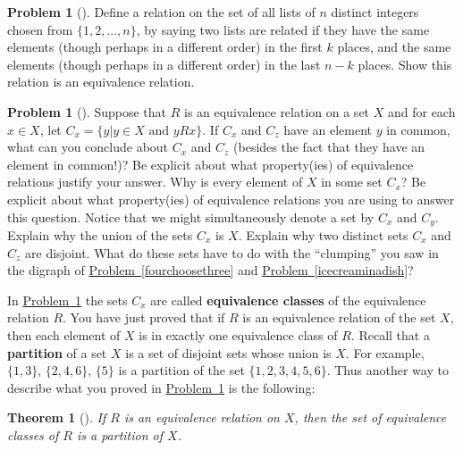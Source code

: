 \documentclass[10pt,]{book}
\newcommand{\terminology}[1]{\textbf{#1}}
\theoremstyle{plain}
\newtheorem{theorem}{Theorem}[section]
\theoremstyle{definition}
\newtheorem{activity}[project]{Problem}
\theoremstyle{definition}
\numberwithin{equation}{chapter}
\begin{document}
\begin{activity}[]\marginsymbol[-1em]{} \label{activity-351}
\hypertarget{p-1947}{}%
Define a relation on the set of all lists of \(n\) distinct integers chosen from \(\{1,2,\ldots, n\}\), by saying two lists are related if they have the same elements (though perhaps in a different order) in the first \(k\) places, and the same elements (though perhaps in a different order) in the last \(n-k\) places. Show this relation is an equivalence relation.%
\end{activity}
\begin{activity}[]\marginsymbol[-1em]{} \label{equivalenceclasses}
\hypertarget{p-1949}{}%
Suppose that \(R\) is an equivalence relation on a set \(X\) and for each \(x\in X\), let \(C_x = \{y| y\in X \text{ and }
yRx\}\). If \(C_x\) and \(C_z\) have an element \(y\) in common, what can you conclude about \(C_x\) and \(C_z\) (besides the fact that they have an element in common!)? Be explicit about what property(ies) of equivalence relations justify your answer. Why is every element of \(X\) in some set \(C_x\)? Be explicit about what property(ies) of equivalence relations you are using to answer this question. Notice that we might simultaneously denote a set by \(C_x\) and \(C_y\). Explain why the union of the sets \(C_x\) is \(X\). Explain why two distinct sets \(C_x\) and \(C_z\) are disjoint. What do these sets have to do with the ``clumping'' you saw in the digraph of \hyperref[fourchoosethree]{Problem~\ref{fourchoosethree}} and \hyperref[icecreaminadish]{Problem~\ref{icecreaminadish}}?%
\end{activity}
\hypertarget{p-1951}{}%
In \hyperref[equivalenceclasses]{Problem~\ref{equivalenceclasses}} the sets \(C_x\) are called \terminology{equivalence classes} of the equivalence relation \(R\). You have just proved that if \(R\) is an equivalence relation of the set \(X\), then each element of \(X\) is in exactly one equivalence class of \(R\). Recall that a \terminology{partition} of a set \(X\) is a set of disjoint sets whose union is \(X\). For example, \(\{1,3\}\), \(\{2,4,6\}\), \(\{5\}\) is a partition of the set \(\{1,2,3,4,5,6\}\). Thus another way to describe what you proved in \hyperref[equivalenceclasses]{Problem~\ref{equivalenceclasses}} is the following:%
\begin{theorem}[{}]\label{theorem-10}
\hypertarget{p-1952}{}%
If \(R\) is an equivalence relation on \(X\), then the set of equivalence classes of \(R\) is a partition of \(X\).%
\end{theorem}
\end{document}
